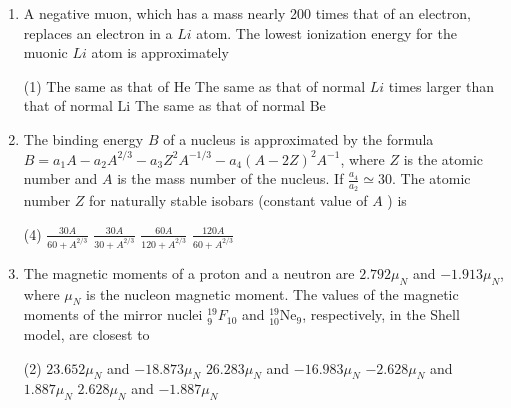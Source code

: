 \begin{enumerate}
	\item A negative muon, which has a mass nearly 200 times that of an electron, replaces an electron in a $L i$ atom. The lowest ionization energy for the muonic $L i$ atom is approximately
	{	}
	\begin{tasks}(1)
		\task[\textbf{A.}] The same as that of $\mathrm{He}$
		\task[\textbf{B.}] The same as that of normal $L i$
		 times larger than that of normal $\mathrm{Li}$
		\task[\textbf{D.}]  The same as that of normal $\mathrm{Be}$
	\end{tasks}
	\item The binding energy $B$ of a nucleus is approximated by the formula $B=a_{1} A-a_{2} A^{2 / 3}-a_{3} Z^{2} A^{-1 / 3}-a_{4}(A-2 Z)^{2} A^{-1}$, where $Z$ is the atomic number and $A$ is the mass number of the nucleus. If $\frac{a_{4}}{a_{2}} \simeq 30$. The atomic number $Z$ for naturally stable isobars (constant value of $A$ ) is
	{	}
	\begin{tasks}(4)
		\task[\textbf{A.}]  $\frac{30 A}{60+A^{2 / 3}}$
		\task[\textbf{B.}] $\frac{30 A}{30+A^{2 / 3}}$
		\task[\textbf{C.}]  $\frac{60 A}{120+A^{2 / 3}}$
		\task[\textbf{D.}] $\frac{120 A}{60+A^{2 / 3}}$
	\end{tasks}
	\item The magnetic moments of a proton and a neutron are $2.792 \mu_{N}$ and $-1.913 \mu_{N}$, where $\mu_{N}$ is the nucleon magnetic moment. The values of the magnetic moments of the mirror nuclei ${ }_{9}^{19} F_{10}$ and ${ }_{10}^{19} \mathrm{Ne}_{9}$, respectively, in the Shell model, are closest to
	{	}
	\begin{tasks}(2)
		\task[\textbf{A.}] $23.652 \mu_{N}$ and $-18.873 \mu_{N}$
		\task[\textbf{B.}] $26.283 \mu_{N}$ and $-16.983 \mu_{N}$
		\task[\textbf{C.}] $-2.628 \mu_{N}$ and $1.887 \mu_{N}$
		\task[\textbf{D.}] $2.628 \mu_{N}$ and $-1.887 \mu_{N}$
	\end{tasks}
\end{enumerate}
\setlength\arrayrulewidth{1pt}
